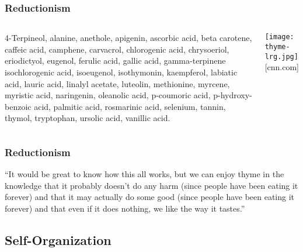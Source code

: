 \begin{frame}
  \frametitle{Reductionism}

  \begin{columns}
    \begin{block}{}
      4-Terpineol, alanine, anethole, apigenin, ascorbic acid, beta
      carotene, caffeic acid, camphene, carvacrol, chlorogenic acid,
      chrysoeriol, eriodictyol, eugenol, ferulic acid, gallic acid,
      gamma-terpinene isochlorogenic acid, isoeugenol, isothymonin,
      kaempferol, labiatic acid, lauric acid, linalyl acetate, luteolin,
      methionine, myrcene, myristic acid, naringenin, oleanolic acid,
      p-coumoric acid, p-hydroxy-benzoic acid, palmitic acid, rosmarinic
      acid, selenium, tannin, thymol, tryptophan, ursolic acid, vanillic
      acid.
    \end{block}
    \texttt{[image: thyme-lrg.jpg]}\\
    {\mbox{} \hfill \tiny [cnn.com]}
  \end{columns}

\end{frame}

\begin{frame}
  \frametitle{Reductionism}

  \begin{block}{}
  ``It would be great to know how this all works, but  we
  can enjoy thyme in the knowledge that it probably doesn't do any harm
  (since people have been eating it forever) and that it may actually do
  some good (since people have been eating it forever) and that even if
  it does nothing, we like the way it tastes.''

  \bigskip

  \end{block}

\end{frame}

\subsection{Self-Organization}

